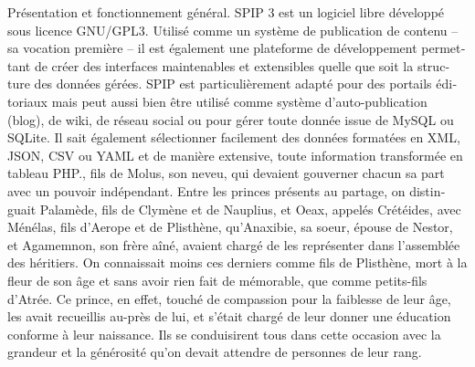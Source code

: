 \documentclass{article}
\begin{document}
\begin{pages}
\begin{Leftside}
\begin{french}
{{Présentation et fonctionnement général. 
SPIP 3 est un logiciel libre développé sous licence GNU/GPL3. Utilisé comme un système de publication de contenu – sa vocation première – il est également une plateforme de développement permettant de créer des interfaces maintenables et extensibles quelle que soit la structure des données gérées.
SPIP est particulièrement adapté pour des portails éditoriaux mais peut aussi bien être utilisé comme système d’auto-publication (blog), de wiki, de réseau social ou pour gérer toute donnée issue de MySQL ou SQLite.
Il sait également sélectionner facilement des données formatées en XML, JSON, CSV ou YAML et de manière extensive, toute information transformée en tableau PHP.}}, fils de Molus, son neveu, qui devaient gouverner chacun sa part avec un pouvoir indépendant. Entre les princes présents au partage, on distinguait Palamède, fils de Clymène et de Nauplius, et Oeax, appelés Crétéides, avec Ménélas, fils d'Ae\-ro\-pe et de Plisthène, qu'Anaxibie, sa soeur, épouse de Nestor, et Agamemnon, son frère aîné, avaient chargé de les représenter dans l'assemblée des héritiers. On connaissait moins ces derniers comme fils de Plisthène, mort à la fleur de son âge et sans avoir rien fait de mémorable, que comme petits-fils d'Atrée. Ce prince, en effet, touché de compassion pour la faiblesse de leur âge, les avait recueillis au-près de lui, et s'était chargé de leur donner une éducation conforme à leur naissance. Ils se conduisirent tous dans cette occasion avec la grandeur et la générosité qu'on devait attendre de personnes de leur rang.
 \pend
 \pstart


\end{french}
\end{Leftside}
\end{pages}
\end{document}
